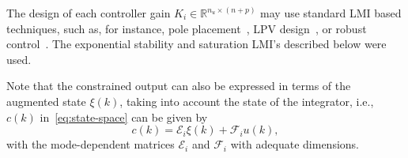 The design of each controller gain \(K_i\in\mathbb{R}^{n_u\times{}(n+p)}\) may use
standard LMI based techniques, such as, for instance, pole
placement~\parencite{yu:lmis}, LPV design~\parencite{briat:linear}, or robust
control~\parencite{boyd.ghaoui.ea:linear}. The exponential stability and
saturation LMI's described below were used.

Note that the constrained output can also be expressed in terms of the augmented
state \(\xi(k)\), taking into account the state of the integrator, i.e., \(c(k)\)
in~\eqref{eq:state-space} can be given by
%
\begin{equation}
  \label{eq:constrained-output}
  c(k) = \mathcal{E}_i\xi(k) + \mathcal{F}_i u(k),
\end{equation}
%
with the mode-dependent matrices \(\mathcal{E}_i\) and \(\mathcal{F}_i\) with
adequate dimensions.

